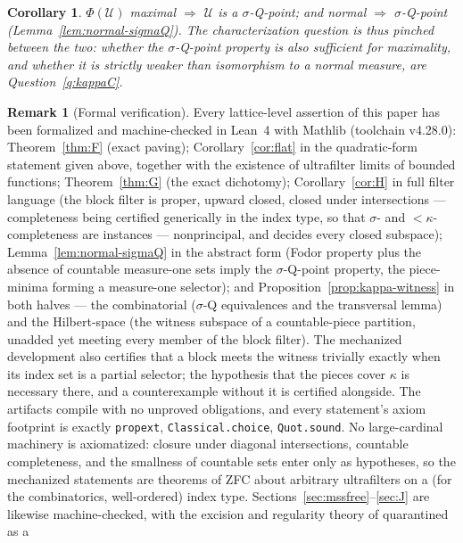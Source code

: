 \documentclass[11pt,reqno]{amsart}
\newtheorem{corollary}[theorem]{Corollary}
\theoremstyle{definition}
\newtheorem{remark}[theorem]{Remark}
\newcommand{\U}{\mathcal{U}}
\begin{document}
\begin{corollary}\label{cor:necessity}
$\Phi(\U)$ maximal $\Rightarrow$ $\U$ is a $\sigma$-Q-point; and normal
$\Rightarrow$ $\sigma$-Q-point (Lemma~\ref{lem:normal-sigmaQ}). The
characterization question is thus pinched between the two: whether the
$\sigma$-Q-point property is also \emph{sufficient} for maximality, and whether
it is strictly weaker than isomorphism to a normal measure, are
Question~\ref{q:kappaC}.
\end{corollary}

\begin{remark}[Formal verification]\label{rem:lean3}
Every lattice-level assertion of this paper has been formalized and
machine-checked in Lean~4 with Mathlib (toolchain v4.28.0):
Theorem~\ref{thm:F} (exact paving); Corollary~\ref{cor:flat} in the
quadratic-form statement given above, together with the existence of ultrafilter
limits of bounded functions;
Theorem~\ref{thm:G} (the exact dichotomy); Corollary~\ref{cor:H} in full
filter language (the block filter is proper, upward closed, closed under
intersections --- completeness being certified generically in the index type, so that
$\sigma$- and ${<}\kappa$-completeness are instances --- nonprincipal, and decides
every closed subspace);
Lemma~\ref{lem:normal-sigmaQ} in the abstract form (Fodor property plus the
absence of countable measure-one sets imply the $\sigma$-Q-point property,
the piece-minima forming a measure-one selector); and
Proposition~\ref{prop:kappa-witness} in both halves --- the combinatorial
($\sigma$-Q equivalences and the transversal lemma) and the Hilbert-space
(the witness subspace of a countable-piece partition, unadded yet meeting
every member of the block filter). The mechanized development also certifies
that a block meets the witness trivially exactly when its index set is a partial
selector; the hypothesis that the pieces cover $\kappa$ is necessary there, and a
counterexample without it is certified alongside. The artifacts compile with no
unproved obligations, and every statement's axiom footprint is exactly
\texttt{propext}, \texttt{Classical.choice}, \texttt{Quot.sound}. No
large-cardinal machinery is axiomatized: closure under diagonal
intersections, countable completeness, and the smallness of countable sets
enter only as hypotheses, so the mechanized statements are theorems of ZFC
about arbitrary ultrafilters on a (for the combinatorics, well-ordered)
index type. Sections~\ref{sec:mssfree}--\ref{sec:J} are likewise machine-checked, with
the excision and regularity theory of \cite{BlecherWeaver} quarantined as a

\end{remark}
\end{document}
